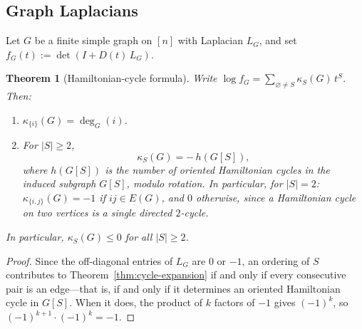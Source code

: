 \documentclass[10pt,a4paper]{amsart}
\newtheorem{thm}{Theorem}[section]
\begin{document}
\subsection{Graph Laplacians}

Let $G$ be a finite simple graph on $[n]$ with Laplacian $L_G$,
and set $f_G(t) := \det(I + D(t)\, L_G)$.


\begin{thm}[Hamiltonian-cycle formula]
\label{thm:hamiltonian}
Write $\log f_G = \sum_{\varnothing\neq S} \kappa_S(G)\, t^S$.
Then:
\begin{enumerate}
  \item[\textup{(i)}]
  $\kappa_{\{i\}}(G) = \deg_G(i)$.
  \item[\textup{(ii)}]
  For $|S|\ge 2$,
  \[
    \kappa_S(G) = -\,h(G[S]),
  \]
  where $h(G[S])$ is the number of oriented Hamiltonian cycles
  in the induced subgraph $G[S]$, modulo rotation.
  In particular, for $|S|=2$: $\kappa_{\{i,j\}}(G) = -1$ if
  $ij\in E(G)$, and $0$ otherwise, since a Hamiltonian cycle on
  two vertices is a single directed $2$-cycle.
\end{enumerate}
In particular, $\kappa_S(G)\le 0$ for all $|S|\ge 2$.
\end{thm}

\begin{proof}
Since the off-diagonal entries of $L_G$ are $0$ or $-1$, an ordering of $S$ contributes to Theorem~\ref{thm:cycle-expansion} if and only if every consecutive pair is an edge---that is, if and only if it determines an oriented Hamiltonian cycle in $G[S]$.  When it does, the product of $k$ factors of $-1$ gives $(-1)^k$, so $(-1)^{k+1}\cdot(-1)^k = -1$.
\end{proof}
\end{document}
